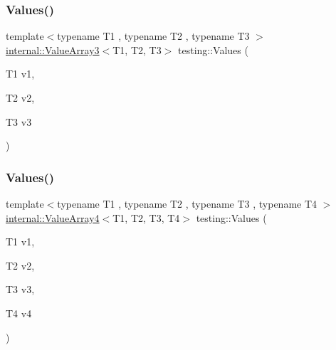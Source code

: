 \mbox{\label{namespacetesting_a344ca3522cb99a7b98801a9577993011}} 
\subsubsection{\texorpdfstring{Values()}{Values()}\hspace{0.1cm}{\footnotesize\ttfamily [3/50]}}
{\footnotesize\ttfamily template$<$typename T1 , typename T2 , typename T3 $>$ \\
\mbox{\hyperlink{classtesting_1_1internal_1_1ValueArray3}{internal\+::\+Value\+Array3}}$<$T1, T2, T3$>$ testing\+::\+Values (\begin{DoxyParamCaption}\item[{T1}]{v1,  }\item[{T2}]{v2,  }\item[{T3}]{v3 }\end{DoxyParamCaption})}

\mbox{\label{namespacetesting_a4b14d4b6e471a1fb8ee3e5706dbc11c6}} 
\subsubsection{\texorpdfstring{Values()}{Values()}\hspace{0.1cm}{\footnotesize\ttfamily [4/50]}}
{\footnotesize\ttfamily template$<$typename T1 , typename T2 , typename T3 , typename T4 $>$ \\
\mbox{\hyperlink{classtesting_1_1internal_1_1ValueArray4}{internal\+::\+Value\+Array4}}$<$T1, T2, T3, T4$>$ testing\+::\+Values (\begin{DoxyParamCaption}\item[{T1}]{v1,  }\item[{T2}]{v2,  }\item[{T3}]{v3,  }\item[{T4}]{v4 }\end{DoxyParamCaption})}

\mbox{\label{namespacetesting_aa2c5f97a44a14ae95da8313b115b6396}} 
